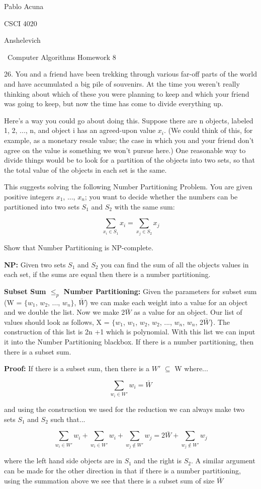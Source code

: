 \documentclass{article}
\begin{document}
Pablo Acuna

CSCI 4020

Anshelevich

{\centering\ Computer Algorithms Homework 8 \par}

26. You and a friend have been trekking through various
far-off parts of the world and have accumulated a big pile
of souvenirs. At the time you weren’t really thinking about
which of these you were planning to keep and which your friend
was going to keep, but now the time has come to divide
everything up.

Here’s a way you could go about doing this. Suppose there
are n objects, labeled 1, 2, ..., n, and object i
has an agreed-upon value $x_i$. (We could think of this,
for example, as a monetary resale value; the case in which
you and your friend don’t agree on the value is something we
won’t pursue here.) One reasonable way to divide things would
be to look for a partition of the objects into two sets, so
that the total value of the objects in each set is the same.

This suggests solving the following Number Partitioning
Problem. You are given positive integers $x_1$, ..., $x_n$;
you want to decide whether the numbers can be partitioned
into two sets $S_1$ and $S_2$ with the same sum:

$$\sum_{x_i \in S_1} x_i  =  \sum_{x_j \in S_2} x_{j} $$

Show that Number Partitioning is NP-complete. \newline

\textbf{NP:} Given two sets $S_1$ and $S_2$ you can find the
sum of all the objects values in each set, if the sums are
equal then there is a number partitioning. \newline

\textbf{Subset Sum $\leq_{p}$ Number Partitioning:}  Given the parameters
for subset sum (W = $\{$$w_1$, $w_2$, ..., $w_n$$\}$, $\bar{W}$) we can make each weight
into a value for an object and we double the list.  Now we make 2$\bar{W}$ as
a value for an object.  Our list of values should look as follows,
X = $\{$$w_1$, $w_1$, $w_2$, $w_2$, ..., $w_n$, $w_n$, 2$\bar{W}$$\}$.  The construction
of this list is 2n +1 which is polynomial.  With this
list we can input it into the Number Partitioning blackbox.  If there is
a number partitioning, then there is a subset sum. \newline

\textbf{Proof:} If there is a subset sum, then there is a $W'$ $\subseteq$ W where...

 $$ \sum_{w_i \in W'} w_i  =  \bar{W} $$

 and using the construction we used for the reduction we can always make two sets
 $S_1$ and $S_2$ such that...

 $$ \sum_{w_i \in W'} w_i + \sum_{w_i \in W'} w_i + \sum_{w_j \notin W'} w_j = 2\bar{W} + \sum_{w_j \notin W'} w_j $$

where the left hand side objects are in $S_1$ and the right is $S_2$.  A similar argument
can be made for the other direction in that if there is a number partitioning, using the summation above we
see that there is a subset sum of size $\bar{W}$
\end{document}
